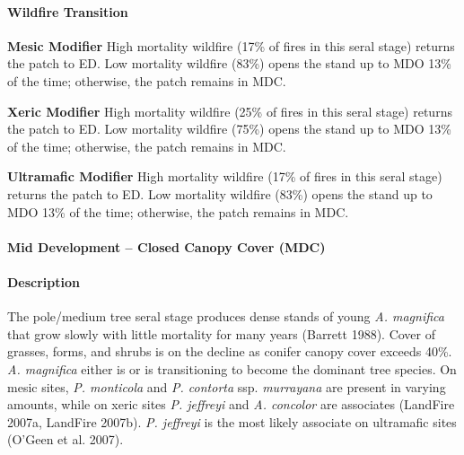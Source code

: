 \paragraph{Wildfire Transition}
\begin{adjustwidth}{2cm}{}
\noindent \textbf{Mesic Modifier } High mortality wildfire (17\% of fires in this seral stage) returns the patch to ED. Low mortality wildfire (83\%) opens the stand up to MDO 13\% of the time; otherwise, the patch remains in MDC. 

\medskip
\noindent \textbf{Xeric Modifier}  High mortality wildfire (25\% of fires in this seral stage) returns the patch to ED. Low mortality wildfire (75\%) opens the stand up to MDO 13\% of the time; otherwise, the patch remains in MDC.

\medskip
\noindent \textbf{Ultramafic Modifier} High mortality wildfire (17\% of fires in this seral stage) returns the patch to ED. Low mortality wildfire (83\%) opens the stand up to MDO 13\% of the time; otherwise, the patch remains in MDC.

\end{adjustwidth}

\noindent\hrulefill

\paragraph{Mid Development – Closed Canopy Cover (MDC)}

\paragraph{Description} The pole/medium tree seral stage produces dense stands of young \emph{A. magnifica} that grow slowly with little mortality for many years (Barrett 1988). Cover of grasses, forms, and shrubs is on the decline as conifer canopy cover exceeds 40\%. \emph{A. magnifica} either is or is transitioning to become the dominant tree species. On mesic sites, \emph{P. monticola} and \emph{P. contorta} ssp. \emph{murrayana} are present in varying amounts, while on xeric sites \emph{P. jeffreyi} and \emph{A. concolor} are associates (LandFire 2007a, LandFire 2007b). \emph{P. jeffreyi} is the most likely associate on ultramafic sites (O'Geen et al. 2007).

